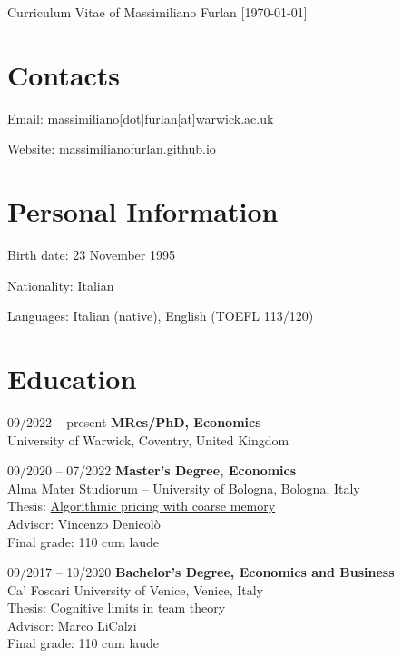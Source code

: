 \documentclass[11pt,a4paper]{article}
\begin{document}
\date{}
\thispagestyle{empty}
\setlength\cvlabelwidth{90pt}

\begin{cv}{\LARGE Curriculum Vitae of Massimiliano Furlan \large{[\mydatestyle\today]}} %

\section{Contacts}

\begin{cvlist}{}
	\itemsep -4pt
	\item[Email:] \href{mailto:massimiliano[dot]furlan[at]warwick.ac.uk}{massimiliano[dot]furlan[at]warwick.ac.uk}
	\item[Website:] \href{https://massimilianofurlan.github.io}{massimilianofurlan.github.io}
\end{cvlist}
\vspace{-20pt}

\section{Personal Information}

\begin{cvlist}{}
	\itemsep -4pt
	\item[Birth date:] 23 November 1995
	\item[Nationality:] Italian
	\item[Languages:] Italian (native), English (TOEFL 113/120)
\end{cvlist}
\vspace{-20pt}

\section{Education}

\begin{cvlist}{}
	\item[09/2022 -- \hspace{0.1pt} present] \textbf{MRes/PhD, Economics}\\ 
		University of Warwick, Coventry, United Kingdom
	\item[09/2020 -- 07/2022] \textbf{Master's Degree, Economics}\\ 
		Alma Mater Studiorum -- University of Bologna, Bologna, Italy\\
		Thesis: \href{https://github.com/massimilianofurlan/algorithmic_pricing/tree/coarse_memory}{Algorithmic pricing with coarse memory}\\
		Advisor: Vincenzo Denicolò\\
		Final grade: 110 cum laude%
	\item[09/2017 -- 10/2020] \textbf{Bachelor's Degree, Economics and Business} \\
		Ca' Foscari University of Venice, Venice, Italy\\
		Thesis: Cognitive limits in team theory\\
		Advisor: Marco LiCalzi\\
		Final grade: 110 cum laude%
\end{cvlist}
\vspace{-20pt}


\end{cv}
\end{document}
